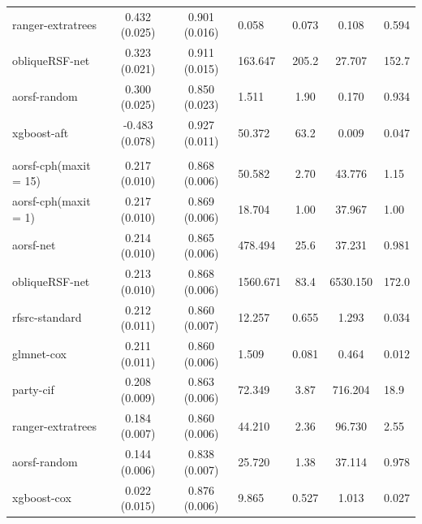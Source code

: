 \documentclass[twoside,11pt]{article}\usepackage[]{graphicx}\usepackage[]{color}
\newenvironment{knitrout}{}{} %
\begin{document}
\begin{knitrout}
\begin{longtable}{lcclccl}
\hspace{1em}ranger-extratrees & 0.432 (0.025) & 0.901 (0.016) & 0.058 & 0.073 & 0.108 & 0.594\\
\hspace{1em}obliqueRSF-net & 0.323 (0.021) & 0.911 (0.015) & 163.647 & 205.2 & 27.707 & 152.7\\
\hspace{1em}aorsf-random & 0.300 (0.025) & 0.850 (0.023) & 1.511 & 1.90 & 0.170 & 0.934\\
\hspace{1em}xgboost-aft & -0.483 (0.078) & 0.927 (0.011) & 50.372 & 63.2 & 0.009 & 0.047\\
\addlinespace[0.3em]
\hline
\multicolumn{7}{l}{\textit{\textbf{Non-alcohol fatty liver disease; death, n = 17549, p = 24}}}\\
\hline
\hspace{1em}aorsf-cph(maxit = 15) & 0.217 (0.010) & 0.868 (0.006) & 50.582 & 2.70 & 43.776 & 1.15\\
\hspace{1em}aorsf-cph(maxit = 1) & 0.217 (0.010) & 0.869 (0.006) & 18.704 & 1.00 & 37.967 & 1.00\\
\hspace{1em}aorsf-net & 0.214 (0.010) & 0.865 (0.006) & 478.494 & 25.6 & 37.231 & 0.981\\
\hspace{1em}obliqueRSF-net & 0.213 (0.010) & 0.868 (0.006) & 1560.671 & 83.4 & 6530.150 & 172.0\\
\hspace{1em}rfsrc-standard & 0.212 (0.011) & 0.860 (0.007) & 12.257 & 0.655 & 1.293 & 0.034\\
\hspace{1em}glmnet-cox & 0.211 (0.011) & 0.860 (0.006) & 1.509 & 0.081 & 0.464 & 0.012\\
\hspace{1em}party-cif & 0.208 (0.009) & 0.863 (0.006) & 72.349 & 3.87 & 716.204 & 18.9\\
\hspace{1em}ranger-extratrees & 0.184 (0.007) & 0.860 (0.006) & 44.210 & 2.36 & 96.730 & 2.55\\
\hspace{1em}aorsf-random & 0.144 (0.006) & 0.838 (0.007) & 25.720 & 1.38 & 37.114 & 0.978\\
\hspace{1em}xgboost-cox & 0.022 (0.015) & 0.876 (0.006) & 9.865 & 0.527 & 1.013 & 0.027\\

\end{longtable}
\end{knitrout}
\end{document}
